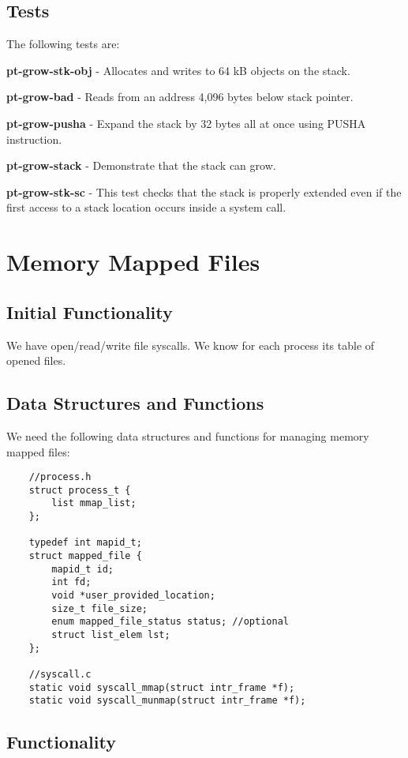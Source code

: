 \subsection{Tests}

The following tests are: 

\textbf{pt-grow-stk-obj} - Allocates and writes to 64 kB objects on the stack. 

\textbf{pt-grow-bad} - Reads from an address 4,096 bytes below stack pointer. 

\textbf{pt-grow-pusha} - Expand the stack by 32 bytes all at once using PUSHA instruction. 

\textbf{pt-grow-stack} - Demonstrate that the stack can grow. 

\textbf{pt-grow-stk-sc} - This test checks that the stack is properly extended even if the first access to a stack location occurs inside a system call. 



\section{Memory Mapped Files}
\subsection{Initial Functionality}

We have open/read/write file syscalls. We know for each process its table of opened files.


\subsection{Data Structures and Functions}

We need the following data structures and functions for managing memory mapped files: 

\begin{lstlisting}
	//process.h
	struct process_t {
		list mmap_list;
	};

	typedef int mapid_t;
	struct mapped_file {
		mapid_t id;
		int fd;
		void *user_provided_location;
		size_t file_size;
		enum mapped_file_status status; //optional
		struct list_elem lst;
	};

	//syscall.c
	static void syscall_mmap(struct intr_frame *f);
	static void syscall_munmap(struct intr_frame *f);
\end{lstlisting}
	


\subsection{Functionality}

